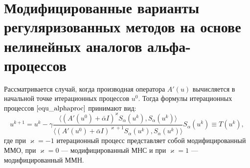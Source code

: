 \section{Модифицированные варианты регуляризованных методов на основе нелинейных аналогов альфа-процессов}
Рассматривается случай, когда производная оператора $A'(u)$ вычисляется в начальной точке итерационных процессов $u^0$. Тогда формулы итерационных процессов $\eqref{equ_alphaproc}$ принимают вид:
\begin{equation}\label{modalphaproc}
u^{k+1}=u^k-\gamma\frac{\langle (A'(u^0)+\bar\alpha I)^{\varkappa}S_\alpha(u^k), S_\alpha(u^k)\rangle}{\langle (A'(u^0)+\bar\alpha I)^{\varkappa+1}S_\alpha(u^k), S_\alpha(u^k)\rangle}S_\alpha(u^k)\equiv T(u^k),
\end{equation}
где при $\varkappa=-1$ итерационный процесс представляет собой модифицированный ММО, при $\varkappa=0$ --- модифицированный МНС и при $\varkappa=1$ --- модифицированный ММН.

